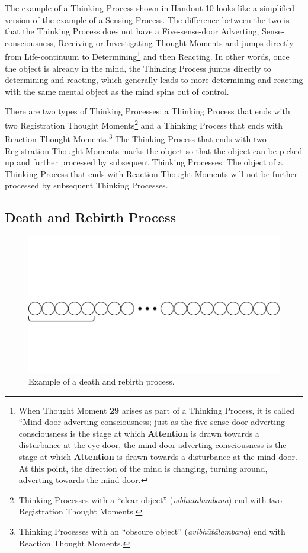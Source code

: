 The example of a Thinking Process shown in Handout 10 looks like a simplified version of the example of a Sensing Process. The difference between the two is that the Thinking Process does not have a Five-sense-door Adverting, Sense-consciousness, Receiving or Investigating Thought Moments and jumps directly from Life-continuum to Determining\footnote{When Thought Moment \textbf{29} arises as part of a Thinking Process, it is called “Mind-door adverting consciousness; just as the five-sense-door adverting consciousness is the stage at which \textbf{Attention} is drawn towards a disturbance at the eye-door, the mind-door adverting consciousness is the stage at which \textbf{Attention} is drawn towards a disturbance at the mind-door. At this point, the direction of the mind is changing, turning around, adverting towards the mind-door.} and then Reacting. In other words, once the object is already in the mind, the Thinking Process jumps directly to determining and reacting, which generally leads to more determining and reacting with the same mental object as the mind spins out of control.

There are two types of Thinking Processes; a Thinking Process that ends with two Registration Thought Moments\footnote{Thinking Processes with a “clear object” (\textit{vibhūtālambana}) end with two Registration Thought Moments.} and a Thinking Process that ends with Reaction Thought Moments.\footnote{Thinking Processes with an “obscure object” (\textit{avibhūtālambana}) end with Reaction Thought Moments.} The Thinking Process that ends with two Registration Thought Moments marks the object so that the object can be picked up and further processed by subsequent Thinking Processes. The object of a Thinking Process that ends with Reaction Thought Moments will not be further processed by subsequent Thinking Processes.

\subsection*{Death and Rebirth Process}

\begin{figure}[h]
\centering
\includegraphics[width=1\linewidth]{./Diagrams/Death}
\caption{Example of a death and rebirth process.}
\label{fig:Death}
\end{figure}

